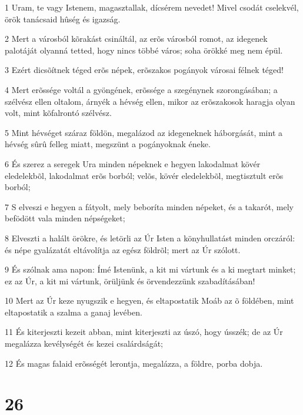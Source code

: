 \par 1 Uram, te vagy Istenem, magasztallak, dícsérem nevedet! Mivel csodát cselekvél, örök tanácsaid hûség és igazság.
\par 2 Mert a városból kõrakást csináltál, az erõs városból romot, az idegenek palotáját olyanná tetted, hogy nincs többé város; soha örökké meg nem épül.
\par 3 Ezért dicsõítnek téged erõs népek, erõszakos pogányok városai félnek téged!
\par 4 Mert erõssége voltál a gyöngének, erõssége a szegénynek szorongásában; a szélvész ellen oltalom, árnyék a hévség ellen, mikor az erõszakosok haragja olyan volt, mint kõfalrontó szélvész.
\par 5 Mint hévséget száraz földön, megalázod az idegeneknek háborgását, mint a hévség sûrû felleg miatt, megszünt a pogányoknak éneke.
\par 6 És szerez a seregek Ura minden népeknek e hegyen lakodalmat kövér eledelekbõl, lakodalmat erõs borból; velõs, kövér eledelekbõl, megtisztult erõs borból;
\par 7 S elveszi e hegyen a fátyolt, mely beboríta minden népeket, és a takarót, mely befödött vala minden népségeket;
\par 8 Elveszti a halált örökre, és letörli az Úr Isten a könyhullatást minden orczáról: és népe gyalázatát eltávolítja az egész földrõl; mert az Úr szólott.
\par 9 És szólnak ama napon: Ímé Istenünk, a kit mi vártunk és a ki megtart minket; ez az Úr, a kit mi vártunk, örüljünk és örvendezzünk szabadításában!
\par 10 Mert az Úr keze nyugszik e hegyen, és eltapostatik Moáb az õ földében, mint eltapostatik a szalma a ganaj levében.
\par 11 És kiterjeszti kezeit abban, mint kiterjeszti az úszó, hogy ússzék; de az Úr megalázza kevélységét és kezei csalárdságát;
\par 12 És magas falaid erõsségét lerontja, megalázza, a földre, porba dobja.

\chapter{26}

